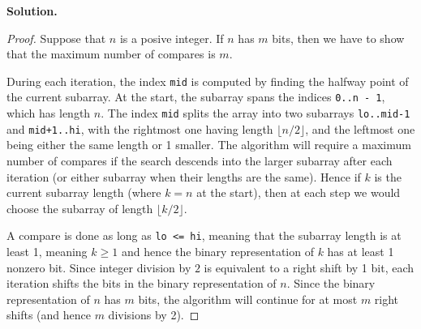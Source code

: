 \documentclass[12pt, a4paper]{article}
\newenvironment{sol}[1][Solution]
{\par\medskip\noindent \textbf{#1.} }
{\medskip}
\begin{document}
	\begin{sol}
		\begin{proof}
			Suppose that $n$ is a posive integer. If $n$ has $m$ bits, then we have to
			show that the maximum number of compares is $m$.
			
			During each iteration, the index \texttt{mid} is computed by finding the
			halfway point of the current subarray. At the start, the subarray spans
			the indices \texttt{0..n - 1}, which has length $n$. The index \texttt{mid}
			splits the array into two subarrays \texttt{lo..mid-1} and \texttt{mid+1..hi},
			with the rightmost one having length $\lfloor n / 2\rfloor$, and the leftmost one
			being either the same length or 1 smaller. The algorithm will require
			a maximum number of compares if the search descends into the larger subarray
			after each iteration (or either subarray when their lengths are the same).
			Hence if $k$ is the current subarray length (where $k=n$ at the start), then
			at each step we would choose the subarray of length $\lfloor k / 2 \rfloor$.
			
			A compare is done as long as \texttt{lo <= hi}, meaning that the subarray
			length is at least 1, meaning $k\geq 1$ and hence the binary representation
			of $k$ has at least 1 nonzero bit. Since integer division by $2$ is equivalent
			to a right shift by 1 bit, each iteration shifts the bits in the binary
			representation of $n$. Since the binary representation of $n$ has $m$ bits,
			the algorithm will continue for at most $m$ right shifts (and hence $m$ divisions
			by 2).
		\end{proof}
	\end{sol}
	\pagebreak
	\printbibliography
\end{document}
